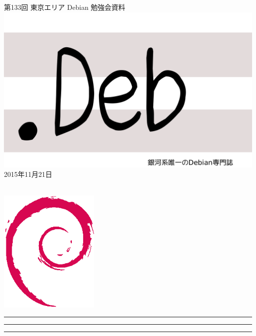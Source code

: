 \documentclass[mingoth,a4paper]{jsarticle}
\newcommand{\debmtgyear}{2015}
\newcommand{\debmtgmonth}{11}
\newcommand{\debmtgdate}{21}
\newcommand{\debmtgnumber}{133}
\begin{document}
\begin{titlepage}
\thispagestyle{empty}

\vspace*{-2cm}
第\debmtgnumber{}回 東京エリア Debian 勉強会資料\\
\hspace*{-2cm}
\includegraphics{image2012-natsu/dotdeb.pdf}\\
\hfill{}\debmtgyear{}年\debmtgmonth{}月\debmtgdate{}日

\\

\vspace*{-2cm}
\hfill{}\includegraphics[height=6cm]{image200502/openlogo-nd.eps}
\end{titlepage}

\newpage

\begin{minipage}[b]{0.2\hsize}
 \colorbox{titleback}{}
\end{minipage}
\begin{minipage}[b]{0.8\hsize}
\hrule
\vspace{2mm}
\hrule
\begin{multicols}{2}
\tableofcontents
\end{multicols}
\vspace{2mm}
\hrule
\end{minipage}
\end{document}
